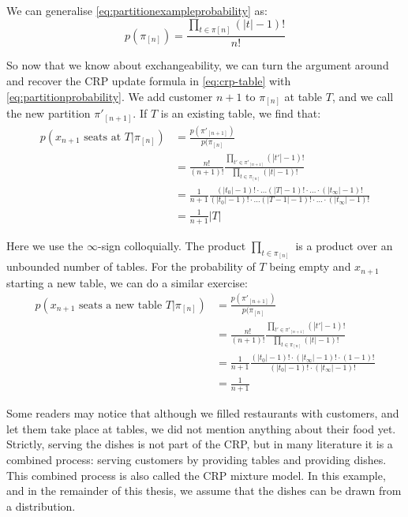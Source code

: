 We can generalise \cref{eq:partitionexampleprobability} as:
\begin{equation}\label{eq:partitionprobability}
	p(\pi_{[n]}) = \frac{\prod_{t\in\pi{[n]}} (|t|-1)!}{n!}
\end{equation}

So now that we know about exchangeability, we can turn the argument around and recover the CRP update formula in \cref{eq:crp-table} with \cref{eq:partitionprobability}. We add customer $n+1$ to $\pi_{[n]}$ at table $T$, and we call the new partition $\pi'_{[n+1]}$. If $T$ is an existing table, we find that:
\begin{equation}
\begin{split}
	p(x_{n+1}\text{ seats at }T|\pi_{[n]}) &= \frac{p(\pi'_{[n+1]})}{p(\pi_{[n]}} \\
     &= \frac{n!}{(n+1)!}\frac{\prod_{t'\in\pi'_{[n+1]}}(|t'|-1)!}{\prod_{t\in\pi_{[n]}}(|t|-1)!} \\
     &= \frac{1}{n+1}\frac{(|t_0|-1)! \cdot \ldots (|T|-1)! \cdot\ldots\cdot (|t_\infty|-1)!}{(|t_0|-1)! \cdot \ldots (|T-1|-1)! \cdot\ldots\cdot (|t_\infty|-1)!} \\
     &= \frac{1}{n+1}|T|
\end{split}
\end{equation}

Here we use the $\infty$-sign colloquially. The product $\prod_{t\in\pi_{[n]}}$ is a product over an unbounded number of tables. For the probability of $T$ being empty and $x_{n+1}$ starting a new table, we can do a similar exercise:
\begin{equation}
\begin{split}
	p(x_{n+1}\text{ seats a new table }T|\pi_{[n]}) &= \frac{p(\pi'_{[n+1]})}{p(\pi_{[n]}} \\
    &= \frac{n!}{(n+1)!}\frac{\prod_{t'\in\pi'_{[n+1]}}(|t'|-1)!}{\prod_{t\in\pi_{[n]}}(|t|-1)!} \\
    &= \frac{1}{n+1}\frac{(|t_0|-1)! \cdot (|t_\infty|-1)! \cdot (1-1)!}{(|t_0|-1)! \cdot (|t_\infty|-1)!} \\
	&= \frac{1}{n+1}
\end{split}
\end{equation}

Some readers may notice that although we filled restaurants with customers, and let them take place at tables, we did not mention anything about their food yet. Strictly, serving the dishes is not part of the CRP, but in many literature it is a combined process: serving customers by providing tables and providing dishes. This combined process is also called the CRP mixture model. In this example, and in the remainder of this thesis, we assume that the dishes can be drawn from a distribution.

